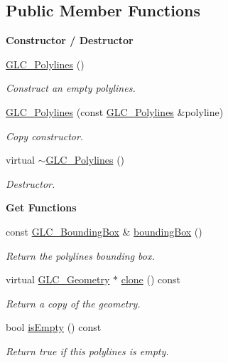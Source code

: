 \subsection*{Public Member Functions}
\begin{Indent}{\bf Constructor / Destructor}\par
\begin{DoxyCompactItemize}
\item 
\hyperlink{class_g_l_c___polylines_ad7e65ba2f682779f4a582749ab4e06e7}{G\-L\-C\-\_\-\-Polylines} ()
\begin{DoxyCompactList}\small\item\em Construct an empty polylines. \end{DoxyCompactList}\item 
\hyperlink{class_g_l_c___polylines_ab74194ffcab43058e73b0e70194e7a5e}{G\-L\-C\-\_\-\-Polylines} (const \hyperlink{class_g_l_c___polylines}{G\-L\-C\-\_\-\-Polylines} \&polyline)
\begin{DoxyCompactList}\small\item\em Copy constructor. \end{DoxyCompactList}\item 
virtual \hyperlink{class_g_l_c___polylines_aa87fdbe543ec299f0d0082a290371ce3}{$\sim$\-G\-L\-C\-\_\-\-Polylines} ()
\begin{DoxyCompactList}\small\item\em Destructor. \end{DoxyCompactList}\end{DoxyCompactItemize}
\end{Indent}
\begin{Indent}{\bf Get Functions}\par
\begin{DoxyCompactItemize}
\item 
const \hyperlink{class_g_l_c___bounding_box}{G\-L\-C\-\_\-\-Bounding\-Box} \& \hyperlink{class_g_l_c___polylines_af87aecbf3e532dc19bb3d7a4eb0b3205}{bounding\-Box} ()
\begin{DoxyCompactList}\small\item\em Return the polylines bounding box. \end{DoxyCompactList}\item 
virtual \hyperlink{class_g_l_c___geometry}{G\-L\-C\-\_\-\-Geometry} $\ast$ \hyperlink{class_g_l_c___polylines_aca55be0575ce8d7e7ec656e7b357695e}{clone} () const 
\begin{DoxyCompactList}\small\item\em Return a copy of the geometry. \end{DoxyCompactList}\item 
bool \hyperlink{class_g_l_c___polylines_ae6b9cd96ab4b27a406b77a5aa6ddc83f}{is\-Empty} () const 
\begin{DoxyCompactList}\small\item\em Return true if this polylines is empty. \end{DoxyCompactList}\end{DoxyCompactItemize}
\end{Indent}

